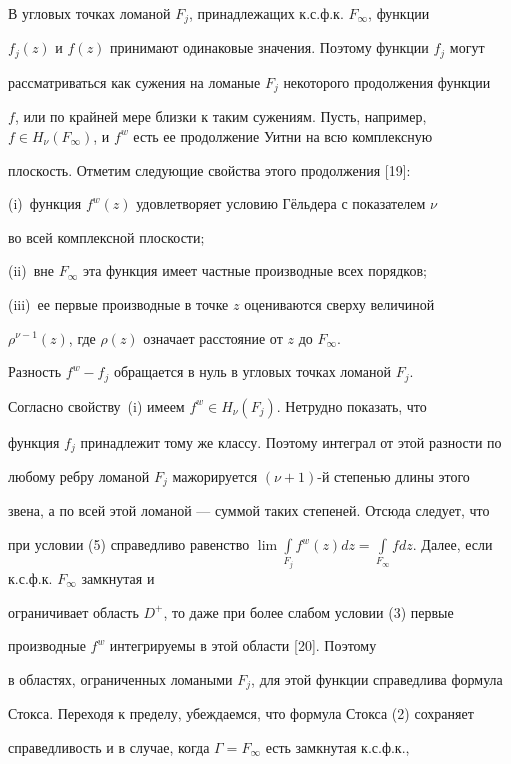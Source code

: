 В угловых точках ломаной $F_j$, принадлежащих к.с.ф.к. $F_\infty$, функции


$f_j (z)$ и $f(z)$ принимают одинаковые значения. Поэтому функции $f_j$ могут


рассматриваться как сужения на ломаные $F_j$ некоторого продолжения функции


$f$, или по крайней мере близки к таким сужениям. Пусть, например, $f\in


H_{\nu}(F_\infty)$, и $f^w$ есть ее продолжение Уитни на всю комплексную


плоскость. Отметим следующие свойства этого продолжения [19]:


(i)~функция $f^{w}(z)$ удовлетворяет условию Г\"ельдера с показателем $\nu$


во всей комплексной плоскости;


(ii)~вне $F_\infty$ эта функция имеет частные производные всех порядков;


(iii)~ее первые производные в точке $z$ оцениваются сверху величиной


$\rho^{\nu -1}(z)$, где $\rho (z)$ означает расстояние от $z$ до $F_\infty$.





Разность $f^w - f_j$ обращается в нуль в угловых точках ломаной $F_j$.


Согласно свойству~(i) имеем $f^w\in H_{\nu}(F_j)$. Нетрудно показать, что


функция $f_j$ принадлежит тому же классу. Поэтому интеграл от этой разности по


любому ребру ломаной $F_j$ мажорируется $(\nu +1)$-й степенью длины этого


звена, а по всей этой ломаной --- суммой таких степеней. Отсюда следует, что


при условии (5) справедливо равенство $\lim\int\limits_{F_j}{f^{w}(z)dz} =


\int\limits_{F_\infty}{fdz}$. Далее, если к.с.ф.к. $F_\infty$ замкнутая и


ограничивает область $D^+$, то даже при более слабом условии (3) первые


производные $f^w$ интегрируемы в этой области [20]. Поэтому


в областях, ограниченных ломаными $F_j$, для этой функции справедлива формула


Стокса. Переходя к пределу, убеждаемся, что формула Стокса (2) сохраняет


справедливость и в случае, когда $\Gamma = F_\infty$ есть замкнутая к.с.ф.к.,


